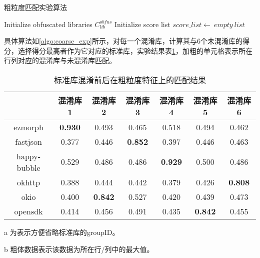 \begin{algorithm}[htb]
  \caption{粗粒度匹配实验算法}
  \label{algo:coarse_exp}
  \small
  \SetAlgoLined

  Initialize obfuscated libraries $C_{lib}^{obfus}$\;
  Initialize score list $score\_list\leftarrow \ empty\ list$\;
\end{algorithm}


具体算法如\ref{algo:coarse_exp}所示，对每一个混淆库，计算其与6个未混淆库的得分，选择得分最高者作为它对应的标准库，实验结果表\ref{tab:coarse_sdk}，加粗的单元格表示所在行列对应的混淆库与未混淆库匹配。


\begin{table}[!hpt]
  \caption{标准库混淆前后在粗粒度特征上的匹配结果}
  \label{tab:coarse_sdk}
  \centering
  \begin{tabular}{ccccccc} \toprule
      & 混淆库1 &  混淆库2 & 混淆库3 & 混淆库4 & 混淆库5 & 混淆库6 \\ \midrule
	ezmorph\tnote{a} & \textbf{0.930}\tnote{b} & 0.493 & 0.465 & 0.518 & 0.494 & 0.462\\
	fastjson & 0.377 & 0.446 & \textbf{0.852} & 0.397 & 0.446 & 0.463 \\
	happy-bubble & 0.529 & 0.486 & 0.486 & \textbf{0.929} & 0.500 & 0.486 \\
	okhttp & 0.388 & 0.444 & 0.442 & 0.379 & 0.426 & \textbf{0.808}\\
	okio & 0.400 & \textbf{0.842} & 0.527 & 0.420 & 0.439 & 0.473\\
	opensdk & 0.414 & 0.456 & 0.491 & 0.435 & \textbf{0.842} & 0.455\\
	 \bottomrule

  \end{tabular}
    \begin{tablenotes}
    \item [a] 为表示方便省略标准库的groupID。%
    \item [b] 粗体数据表示该数据为所在行/列中的最大值。%
    \end{tablenotes}
\end{table}

